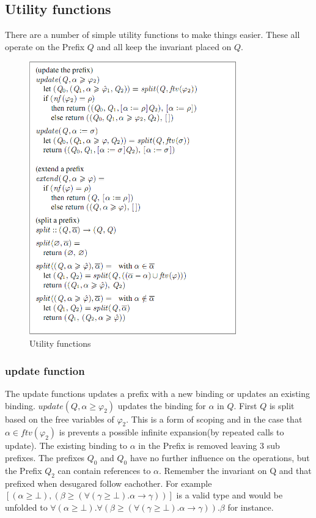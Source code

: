 \documentclass[12pt, a4paper, oneside]{article}
\begin{document}
\subsection{Utility functions}
There are a number of simple utility functions to make things easier. These all operate on the Prefix $Q$ and all keep the invariant placed on $Q$.

\begin{figure}[h!]
  \centering
    \includegraphics[width=0.8\textwidth]{utils}
  \caption{Utility functions}
\end{figure}

\subsubsection{update function}
The update functions updates a prefix with a new binding or updates an existing binding.
$update(Q, \alpha \geq \varphi_2)$ updates the binding for $\alpha$ in $Q$. First $Q$ is split based on the free variables of $\varphi_2$. This is a form of scoping and in the case that $\alpha \in ftv(\varphi_2)$ is prevents a possible infinite expansion(by repeated calls to update). The existing binding to $\alpha$ in the Prefix is removed leaving 3 sub prefixes. The prefixes $Q_0$ and $Q_0$ have no further influence on the operations, but the Prefix $Q_2$ can contain references to $\alpha$. Remember the invariant on Q and that prefixed when desugared follow eachother. For example $[(\alpha \geq \bot), (\beta \geq (\forall(\gamma \geq \bot).\alpha \rightarrow \gamma))]$ is a valid type and would be unfolded to $\forall(\alpha \geq \bot). \forall(\beta \geq (\forall(\gamma \geq \bot).\alpha \rightarrow \gamma)). \beta$ for instance.
\end{document}
